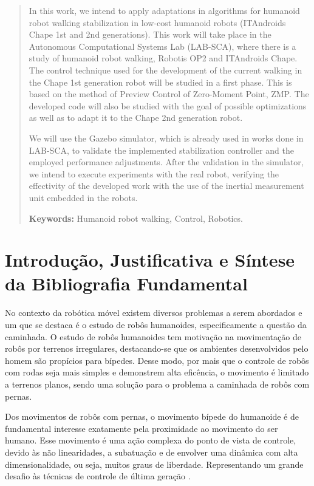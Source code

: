 \begin{abstract}
In this work, we intend to apply adaptations in algorithms for humanoid robot walking stabilization in low-cost humanoid robots (ITAndroids Chape 1st and 2nd generations). This work will take place in the Autonomous Computational Systems Lab (LAB-SCA), where there is a study of humanoid robot walking, Robotis OP2 and ITAndroids Chape. The control technique used for the development of the current walking in the Chape 1st generation robot will be studied in a first phase. This is based on the method of Preview Control of Zero-Moment Point, ZMP. The developed code will also be studied with the goal of possible optimizations as well as to adapt it to the Chape 2nd generation robot.

We will use the Gazebo simulator, which is already used in works done in LAB-SCA, to validate the implemented stabilization controller and the employed performance adjustments. After the validation in the simulator, we intend to execute experiments with the real robot, verifying the effectivity of the developed work with the use of the inertial measurement unit embedded in the robots.

\noindent \textbf{Keywords:} Humanoid robot walking, Control, Robotics.


\end{abstract}
\doublespacing
\newpage
\section{Introdução, Justificativa e Síntese da Bibliografia Fundamental}



No contexto da robótica móvel existem diversos problemas a serem abordados e um que se destaca é o estudo de robôs humanoides, especificamente a questão da caminhada. O estudo de robôs humanoides tem motivação na movimentação de robôs por terrenos irregulares, destacando-se que os ambientes desenvolvidos pelo homem são propícios para bípedes. Desse modo, por mais que o controle de robôs com rodas seja mais simples e demonstrem alta eficência, o movimento é limitado a terrenos planos, sendo uma solução para o problema a caminhada de robôs com pernas.

Dos movimentos de robôs com pernas, o movimento bípede do humanoide é de fundamental interesse exatamente pela proximidade ao movimento do ser humano. Esse movimento é uma ação complexa do ponto de vista de controle, devido às não linearidades, a subatuação e  de envolver uma dinâmica com alta dimensionalidade, ou seja, muitos graus de liberdade. Representando um grande desafio às técnicas de controle de última geração \cite{tedrake2005}.

